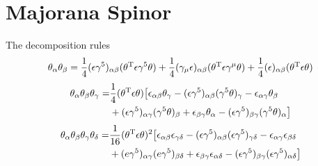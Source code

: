 \section{Majorana Spinor}

The decomposition rules 
\begin{equation}
\tht_{\a}\tht_{\be} = 
\frac{1}{4} (\e\g^5)_{\a\be} (\tht^{\tra}\e\g^5\tht)+ 
\frac{1}{4}(\g_{\m}\e)_{\a\be}({\tht}^{\tra}\e\g^{\m}\tht)+
\frac{1}{4}(\e)_{\a\be}(\tht^{\tra}\e\tht)
\end{equation}
\begin{align}
\tht_\a\tht_\be\tht_\g 
= &\frac{1}{4}
(\tht^{\tra}\e \tht)
\big[
\e_{\a\be}\tht_{\g}
-(\e\g^5)_{\a\be}(\g^5\tht)_{\g}
-\e_{\a\g}\tht_\be\notag\\
&+(\e\g^5)_{\a\g}(\g^5\tht)_\be
+\e_{\be\g}\tht_\a
-(\e\g^5)_{\be\g}(\g^5\tht)_\a
\big]
\end{align}
\begin{align}
	\tht_\a\tht_\be\tht_\g\tht_\de
	=&\frac{1}{16}(\tht^{\tra}\e\tht)^2
	\big[
	\e_{\a\be}\e_{\g\de}
	-(\e\g^5)_{\a\be}(\e\g^5)_{\g\de}
	-\e_{\a\g}\e_{\be\de}\notag\\
	&+(e\g^5)_{\a\g}(e\g^5)_{\be\de}
	+\e_{\be\g}\e_{\a\de}
	-(\e\g^5)_{\be\g}(\e\g^5)_{\a\de}
	\big]
\end{align}
